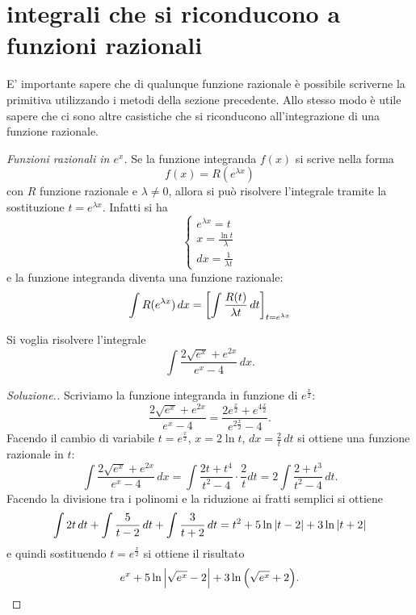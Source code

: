 \section{integrali che si riconducono a funzioni razionali}

E' importante sapere che di qualunque funzione razionale è possibile
scriverne la primitiva utilizzando i metodi della sezione precedente.
Allo stesso modo è utile sapere che ci sono altre casistiche che si
riconducono all'integrazione di una funzione razionale.

\emph{Funzioni razionali in $e^x$.}
Se la funzione integranda $f(x)$ si scrive nella forma
\[
  f(x) = R(e^{\lambda x})
\]
con $R$ funzione razionale e $\lambda\neq 0$,
allora si può risolvere l'integrale tramite la
sostituzione $t = e^{\lambda x}$. Infatti si ha
\[
\begin{cases}
 e^{\lambda x} = t\\
 x = \frac{\ln t}{\lambda}\\
 dx = \frac{1}{\lambda t}
 \end{cases}
\]
e la funzione integranda diventa una funzione razionale:
\[
 \int R(e^{\lambda x})\, dx = {\left[ \int \frac{R(t)}{\lambda t}\, dt \right]}_{t=e^{\lambda x}}
\]

\begin{example}
Si voglia risolvere l'integrale
\[
  \int \frac{2\sqrt{e^x} + e^{2x}}{e^x-4}\, dx.
\]
\end{example}
\begin{proof}[Soluzione.]
Scriviamo la funzione integranda in funzione di $e^{\frac x 2}$:
\[
  \frac{2\sqrt{e^x} + e^{2x}}{e^x-4}
  =\frac{2e^{\frac x 2}+e^{4\frac x 2}}{e^{2\frac x 2}-4}.
\]
Facendo il cambio di variabile $t=e^{\frac x 2}$, $x=2\ln t$, $dx=\frac 2 t\, dt$
si ottiene una funzione razionale in $t$:
\[
  \int \frac{2\sqrt{e^x} + e^{2x}}{e^x-4}\, dx
  = \int \frac{2t + t^4}{t^2-4}\cdot \frac 2 t dt
  = 2\int \frac{2+t^3}{t^2-4}\, dt.
\]
Facendo la divisione tra i polinomi e la riduzione ai fratti semplici si ottiene
\[
 \int 2t\, dt + \int \frac{5}{t-2}\, dt + \int \frac{3}{t+2}\, dt
 = t^2 + 5\ln{\left|t-2\right|} + 3\ln{\left|t+2\right|}
\]
e quindi sostituendo $t=e^{\frac x 2}$ si ottiene il risultato
\[
 e^x + 5 \ln {\left|\sqrt{e^x}-2\right|} + 3 \ln{\left( \sqrt{e^x}+2 \right)}.
\]
\end{proof}

